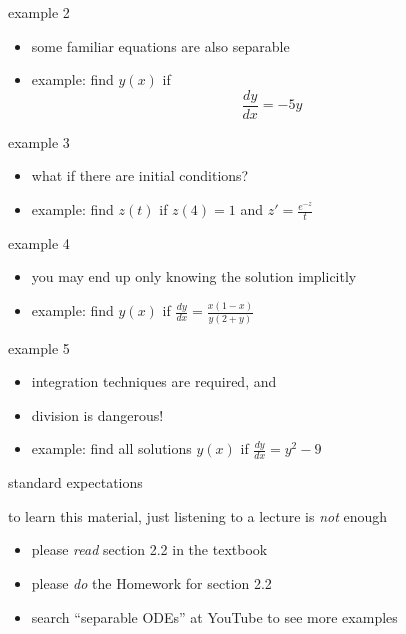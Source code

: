\documentclass{beamer}
\begin{document}
\begin{frame}{example 2}
\begin{itemize}
\item some familiar equations are also separable
\item example: find $y(x)$ if
    $$\frac{dy}{dx} = - 5 y$$
\end{itemize}

\vspace{50mm}
\end{frame}


\begin{frame}{example 3}
\begin{itemize}
\item what if there are initial conditions?
\item example: find $z(t)$ if $z(4)=1$ and \quad $\displaystyle z' = \frac{e^{-z}}{t}$
\end{itemize}

\vspace{50mm}
\end{frame}


\begin{frame}{example 4}
\begin{itemize}
\item you may end up only knowing the solution implicitly
\item example: find $y(x)$ if \quad $\displaystyle \frac{dy}{dx} = \frac{x(1-x)}{y(2+y)}$
\end{itemize}

\vspace{50mm}
\end{frame}


\begin{frame}{example 5}
\begin{itemize}
\item integration techniques are required, and
\item division is dangerous!
\item example: find \alert{all solutions} $y(x)$ if \quad $\displaystyle \frac{dy}{dx} = y^2 - 9$
\end{itemize}

\vspace{50mm}
\end{frame}


\begin{frame}{standard expectations}

to learn this material, just listening to a lecture is \emph{not} enough
\begin{itemize}
\item please \emph{read} section 2.2 in the textbook
\item please \emph{do} the Homework for section 2.2
\item search ``separable ODEs'' at YouTube to see more examples
\end{itemize}
\end{frame}
\end{document}
